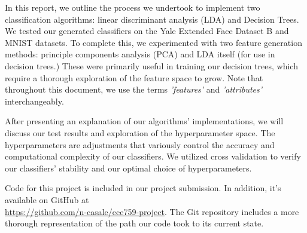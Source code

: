 In this report, we outline the process we undertook to implement two classification algorithms: linear discriminant analysis (LDA) and Decision Trees. We tested our generated classifiers on the Yale Extended Face Dataset B  and MNIST \cite{lecun-mnisthandwrittendigit-2010} datasets. To complete this, we experimented with two feature generation methods: principle components analysis (PCA) and LDA itself (for use in decision trees.) These were primarily useful in training our decision trees, which require a thorough exploration of the feature space to grow. Note that throughout this document, we use the terms \emph{'features'} and \emph{'attributes'} interchangeably.

After presenting an explanation of our algorithms' implementations, we will discuss our test results and exploration of the hyperparameter space. The hyperparameters are adjustments that variously control the accuracy and computational complexity of our classifiers. We utilized cross validation to verify our classifiers' stability and our optimal choice of hyperparameters.

Code for this project is included in our project submission. In addition, it's available on GitHub at\\ \href{https://github.com/n-casale/ece759-project}{https://github.com/n-casale/ece759-project}. The Git repository includes a more thorough representation of the path our code took to its current state. 